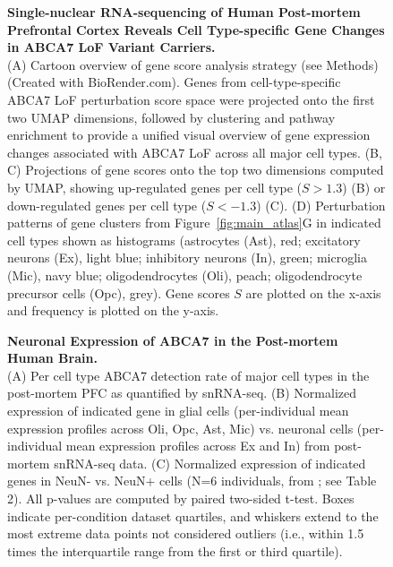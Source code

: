 \begin{figure}[ht]
    \centering
    \caption{
        \textbf{Single-nuclear RNA-sequencing of Human Post-mortem Prefrontal Cortex Reveals Cell Type-specific Gene Changes in ABCA7 LoF Variant Carriers.}\\[1ex]
        (A) Cartoon overview of gene score analysis strategy (see Methods) (Created with BioRender.com). Genes from cell-type-specific ABCA7 LoF perturbation score space were projected onto the first two UMAP dimensions, followed by clustering and pathway enrichment to provide a unified visual overview of gene expression changes associated with ABCA7 LoF across all major cell types. 
        (B, C) Projections of gene scores onto the top two dimensions computed by UMAP, showing up-regulated genes per cell type ($S > 1.3$) (B) or down-regulated genes per cell type ($S < -1.3$) (C). 
        (D) Perturbation patterns of gene clusters from Figure~\ref{fig:main_atlas}G in indicated cell types shown as histograms (astrocytes (Ast), red; excitatory neurons (Ex), light blue; inhibitory neurons (In), green; microglia (Mic), navy blue; oligodendrocytes (Oli), peach; oligodendrocyte precursor cells (Opc), grey). Gene scores $S$ are plotted on the x-axis and frequency is plotted on the y-axis.
    }
    \label{fig:snRNAseq_gene_scores}
\end{figure}

\begin{figure}[ht]
    \centering
    \caption{
        \textbf{Neuronal Expression of ABCA7 in the Post-mortem Human Brain.}\\[1ex]
        (A) Per cell type ABCA7 detection rate of major cell types in the post-mortem PFC as quantified by snRNA-seq. 
        (B) Normalized expression of indicated gene in glial cells (per-individual mean expression profiles across Oli, Opc, Ast, Mic) vs. neuronal cells (per-individual mean expression profiles across Ex and In) from post-mortem snRNA-seq data. 
        (C) Normalized expression of indicated genes in NeuN- vs. NeuN+ cells (N=6 individuals, from \cite{Welch2022-aa}; see Table 2). All p-values are computed by paired two-sided t-test. Boxes indicate per-condition dataset quartiles, and whiskers extend to the most extreme data points not considered outliers (i.e., within 1.5 times the interquartile range from the first or third quartile).
    }
    \label{fig:abca7_expression}
\end{figure}

